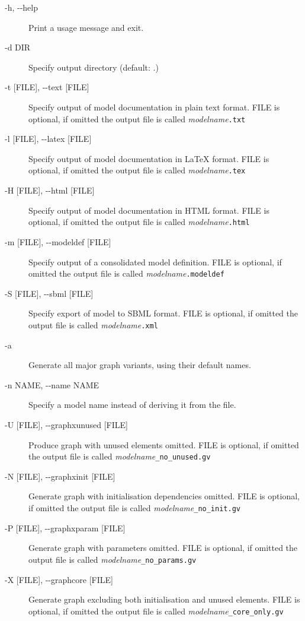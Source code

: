 \documentclass[a4paper,11pt]{article}
\begin{document}
\begin{adjustwidth}{0.8cm}{0.8cm}
\begin{description}
\item[-h, -{}-help] Print a usage message and exit.
\item[-d DIR] Specify output directory (default: .)
\item[-t {[}FILE{]}, -{}-text {[}FILE{]}] Specify output of model documentation in plain text format. FILE is optional, if omitted the output file is called \textit{modelname}\texttt{.txt}
\item[-l {[}FILE{]}, -{}-latex {[}FILE{]}] Specify output of model documentation in \LaTeX{} format. FILE is optional, if omitted the output file is called \textit{modelname}\texttt{.tex}
\item[-H {[}FILE{]}, -{}-html {[}FILE{]}] Specify output of model documentation in HTML format. FILE is optional, if omitted the output file is called \textit{modelname}\texttt{.html}
\item[-m {[}FILE{]}, -{}-modeldef {[}FILE{]}] Specify output of a consolidated model definition. FILE is optional, if omitted the output file is called \textit{modelname}\texttt{.modeldef}
\item[-S {[}FILE{]}, -{}-sbml {[}FILE{]}] Specify export of model to SBML format. FILE is optional, if omitted the output file is called \textit{modelname}\texttt{.xml}
\item[-a] Generate all major graph variants, using their default names.
\item[-n NAME, -{}-name NAME] Specify a model name instead of deriving it from the file.
\item[-U {[}FILE{]}, -{}-graphxunused {[}FILE{]}] Produce graph with unused elements omitted. FILE is optional, if omitted the output file is called \textit{modelname}\texttt{\_no\_unused.gv}
\item[-N {[}FILE{]}, -{}-graphxinit {[}FILE{]}] Generate graph with initialisation dependencies omitted. FILE is optional, if omitted the output file is called \textit{modelname}\texttt{\_no\_init.gv}
\item[-P {[}FILE{]}, -{}-graphxparam {[}FILE{]}] Generate graph with parameters omitted. FILE is optional, if omitted the output file is called \textit{modelname}\texttt{\_no\_params.gv}
\item[-X {[}FILE{]}, -{}-graphcore {[}FILE{]}] Generate graph excluding both initialisation and unused elements. FILE is optional, if omitted the output file is called \textit{modelname}\texttt{\_core\_only.gv}

\end{description}
\end{adjustwidth}
\end{document}
